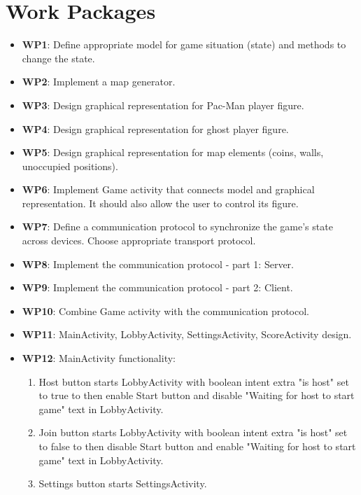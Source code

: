 \documentclass{report}
\begin{document}
\begin{enumerate}
\end{enumerate}


\section{Work Packages}


\begin{itemize}
	\item {\bf WP1}: Define appropriate model for game situation (state) and methods to change the state.
	\item {\bf WP2}: Implement a map generator.         
	\item {\bf WP3}: Design graphical representation for Pac-Man player figure.
	\item {\bf WP4}: Design graphical representation for ghost player figure.
	\item {\bf WP5}: Design graphical representation for map elements (coins, walls, unoccupied positions).
	\item {\bf WP6}: Implement Game activity that connects model and graphical representation. It should also allow the user to control its figure.
	\item {\bf WP7}: Define a communication protocol to synchronize the game's state across devices. Choose appropriate transport protocol.
	\item {\bf WP8}: Implement the communication protocol - part 1: Server.
	\item {\bf WP9}: Implement the communication protocol - part 2: Client.
	\item {\bf WP10}: Combine Game activity with the communication protocol.
	\item {\bf WP11}: MainActivity, LobbyActivity, SettingsActivity, ScoreActivity design.
	\item {\bf WP12}: MainActivity functionality:
		\begin{enumerate}
			\item Host button starts LobbyActivity with boolean intent extra "is host" set to true to then enable Start button and disable "Waiting for host to start game" text in LobbyActivity.
			\item Join button starts LobbyActivity with boolean intent extra "is host" set to false to then disable Start button and enable "Waiting for host to start game" text in LobbyActivity.
			\item Settings button starts SettingsActivity.

\end{enumerate}
\end{itemize}
\end{document}
